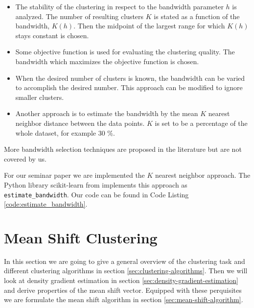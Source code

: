 \documentclass{article}
\begin{document}
\begin{itemize}
	\item The stability of the clustering in respect to the bandwidth parameter $h$ is analyzed. The number of resulting clusters $K$ is stated as a function of the bandwidth, $K(h)$. Then the midpoint of the largest range for which $K(h)$ stays constant is chosen.
	\item Some objective function is used for evaluating the clustering quality. The bandwidth which maximizes the objective function is chosen.
	\item When the desired number of clusters is known, the bandwidth can be varied to accomplish the desired number. This approach can be modified to ignore smaller clusters.
	\item Another approach is to estimate the bandwidth by the mean $K$ nearest neighbor distance between the data points. $K$ is set to be a percentage of the whole dataset, for example 30 \%.
\end{itemize}

More bandwidth selection techniques are proposed in the literature but are not covered by us.

For our seminar paper we are implemented the $K$ nearest neighbor approach. The Python library scikit-learn from \cite{Pedregosa.2011} implements this approach as \texttt{estimate\_bandwidth}. Our code can be found in Code Listing \ref{code:estimate_bandwidth}.

%



\section{Mean Shift Clustering} \label{sec:mean-shift-clustering}

In this section we are going to give a general overview of the clustering task and different clustering algorithms in section \ref{sec:clustering-algorithms}. Then we will look at density gradient estimation in section \ref{sec:density-gradient-estimation} and derive properties of the mean shift vector. Equipped with these perquisites we are formulate the mean shift algorithm in section \ref{sec:mean-shift-algorithm}.
\end{document}

